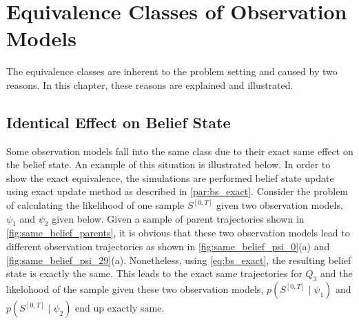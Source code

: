 \chapter{Equivalence Classes of Observation Models}
\label{ap:eq_classes}
The equivalence classes are inherent to the problem setting and caused by two reasons. In this chapter, these reasons are explained and illustrated.
\section*{Identical Effect on Belief State}
\label{ap:eq_classes_same_belief}
Some observation models fall into the same class due to their exact same effect on the belief state. An example of this situation is illustrated below. In order to show the exact equivalence, the simulations are performed belief state update using exact update method as described in \cref{par:bs_exact}. Consider the problem of calculating the likelihood of one sample $ S^{[0,T]} $ given two observation models, $ \psi_1 $ and $ \psi_2 $ given below. Given a sample of parent trajectories shown in \autoref{fig:same_belief_parents}, it is obvious that these two observation models lead to different observation trajectories as shown in \autoref{fig:same_belief_psi_0}(a) and \autoref{fig:same_belief_psi_29}(a). Nonetheless, using \autoref{eq:bs_exact}, the resulting belief state is exactly the same. This leads to the exact same trajectories for $ Q_3 $ and the likelohood of the sample given these two observation models, $ p(S^{[0,T]} \mid \psi_1 ) $ and $ p(S^{[0,T]} \mid \psi_2 ) $ end up exactly same. %

